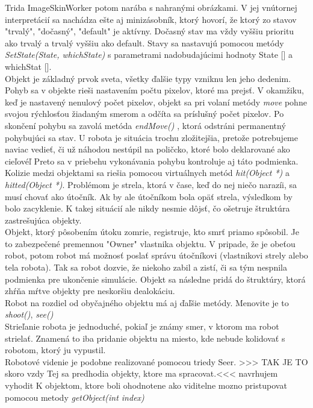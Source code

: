 Trida ImageSkinWorker potom narába  s nahranými obrázkami. V jej vnútornej interpretácií sa nachádza ešte aj minizásobník, ktorý hovorí, že ktorý zo stavov "trvalý", "dočasný", "default" je aktívny. Dočasný stav ma vždy vyššiu prioritu ako trvalý a trvalý vyššiu ako default. Stavy sa nastavujú pomocou metódy { \it SetState(State, whichState) } s parametrami nadobudajúcimi hodnoty State [] a whichStat []. \\%
Objekt je základný prvok sveta, všetky ďalšie typy vzniknu len jeho dedenim. \\
Pohyb sa v objekte rieši nastavením počtu pixelov, ktoré ma prejsť. V okamžiku,  keď je nastavený nenulový počet pixelov, objekt sa pri volaní metódy {\it move} pohne svojou rýchlosťou žiadaným smerom a odčíta sa  príslušný počet pixelov. Po skončení pohybu sa zavolá metóda {\it endMove()} , ktorá odstráni permanentný pohybujúci sa stav. U robota je situácia trochu zložitejšia, pretože potrebujeme naviac vedieť, či už náhodou nestúpil na poličcko, ktoré bolo deklarované ako cieľovéľ Preto sa v priebehu vykonávania pohybu kontroluje aj táto podmienka. \\
Kolizie medzi objektami sa riešia pomocou virtuálnych metód {\it hit(Object *)} a {\it hitted(Object *)}. Problémom je strela, ktorá v čase, keď do nej niečo narazíi, sa musí chovať ako útočník. Ak by ale útočníkom bola opäť strela, výsledkom by bolo zacyklenie. K takej situácií ale nikdy nesmie dôjsť, čo ošetruje štruktúra zastrešujúca objekty.\\
Objekt, ktorý pôsobením útoku zomrie, registruje, kto smrť priamo spôsobil. Je to zabezpečené premennou "Owner" vlastnika objektu. V pripade, že je obeťou robot, potom robot má možnosť poslať správu útočníkovi (vlastnikovi strely alebo tela robota). Tak sa robot dozvie, že niekoho zabil a zistí, či sa tým nespnila podmienka pre ukončenie simulácie. Objekt sa následne pridá do štruktúry, ktorá zhŕňa mŕtve objekty pre neskoršiu dealokáciu.\\
Robot na rozdiel od obyčajného objektu má aj ďaľšie metódy. Menovite je to {\it shoot()}, {\it see()}\\
Strieľanie robota je jednoduché, pokiaľ je známy smer, v ktorom ma robot strielať. Znamená to iba pridanie objektu na miesto, kde nebude kolidovať s robotom, ktorý ju vypustil.\\
Robotové videnie je podobne realizované pomocou triedy Seer. >>> TAK JE TO skoro vzdy Tej sa predhodia objekty, ktore ma spracovat.<<< navrhujem vyhodit K objektom, ktore boli ohodnotene ako viditelne mozno pristupovat pomocou metody {\it getObject(int index)}\\
